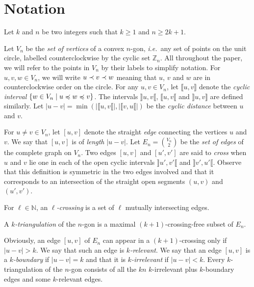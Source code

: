 \documentclass[12pt]{amsart}
\begin{document}


\section{Notation}\label{sectionnotation}

Let $k$ and $n$ be two integers such that $k\ge 1$ and $n\ge 2k+1$.

Let $V_n$ be the \emph{set of vertices} of a convex $n$-gon, {\it i.e.}~any set of points on the unit circle, labelled counterclockwise by the cyclic set $\mathbb{Z}_n$.
All throughout the paper, we will refer to the points in $V_n$ by their labels to simplify notation.
For $u,v,w\in V_n$, we will write $u\prec v\prec w$ meaning that $u$, $v$ and $w$ are in counterclockwise order on the circle.
For any $u,v\in V_n$, let $\llbracket u,v\rrbracket$ denote the \emph{cyclic interval} $\{w\in V_n\;|\; u\preccurlyeq w\preccurlyeq v\}$.
The intervals $\rrbracket u,v\llbracket$, $\llbracket u,v\llbracket$ and $\rrbracket u,v\rrbracket$ are defined similarly.
Let $|u-v|=\min(|\llbracket u, v\llbracket|,|\llbracket v, u\llbracket|)$ be the \emph{cyclic distance} between $u$ and $v$.

For $u\ne v\in V_n$, let $[u,v]$ denote the straight \emph{edge} connecting the vertices $u$ and $v$. We say that $[u,v]$ is of \emph{length} $|u-v|$.
Let $E_n={V_n \choose 2}$ be the \emph{set of edges} of the complete graph on $V_n$.
Two edges $[u,v]$ and $[u',v']$ are said to \emph{cross} when $u$ and $v$ lie one in each of the open cyclic intervals $\rrbracket u',v'\llbracket$ and $\rrbracket v',u'\llbracket$. Observe that this definition is symmetric in the two edges involved and that it corresponds to an intersection of the straight open segments $(u,v)$ and $(u',v')$.

For $\ell\in\mathbb{N}$, an \emph{$\ell$-crossing} is a set of $\ell$ mutually intersecting edges.


\begin{definition}
A \emph{$k$-triangulation} of the $n$-gon is a maximal $(k+1)$-crossing-free subset of $E_n$.
\end{definition}

Obviously, an edge $[u,v]$ of $E_n$ can appear in a $(k+1)$-crossing only if $|u-v|>k$. We say that such an edge is \emph{$k$-relevant}. We say that an edge $[u,v]$ is a \emph{$k$-boundary} if $|u-v|=k$ and that it is \emph{$k$-irrelevant} if $|u-v|<k$.
Every $k$-triangulation of the $n$-gon consists of all the $kn$ $k$-irrelevant plus $k$-boundary edges and some $k$-relevant edges.
\end{document}

